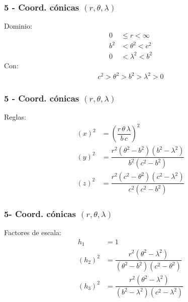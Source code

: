 \documentclass[12pt]{beamer}
\begin{document}
\begin{frame}
\frametitle{5 - Coord. cónicas $(r, \theta, \lambda)$}
\setlength{\abovedisplayskip}{-1pt}
\fontsize{12}{12}\selectfont
Dominio:
\begin{align*}
0 &\leq r < \infty \\
b^{2} &< \theta^{2} < c^{2} \\
0 &< \lambda^{2} < b^{2}
\end{align*}
Con:
\begin{align*}
c^{2} > \theta^{2} > b^{2} > \lambda^{2} > 0
\end{align*}
\end{frame}
\begin{frame}
\frametitle{5 - Coord. cónicas $(r, \theta, \lambda)$}
\setlength{\abovedisplayskip}{-1pt}
\fontsize{12}{12}\selectfont
Reglas:
\begin{align*}
(x)^{2} &= \left( \dfrac{r \, \theta \, \lambda}{b \, c} \right)^{2} \\[0.5em]
(y)^{2} &= \dfrac{r^{2} (\theta^{2} - b^{2})(b^{2} - \lambda^{2})}{b^{2}(c^{2} - b^{2})} \\[0.5em]
(z)^{2} &= \dfrac{r^{2} (c^{2} - \theta^{2})(c^{2} - \lambda^{2})}{c^{2} (c^{2} - b^{2})}
\end{align*}
\end{frame}
\begin{frame}
\frametitle{5- Coord. cónicas $(r, \theta, \lambda)$}
\setlength{\abovedisplayskip}{-1pt}
\fontsize{12}{12}\selectfont
Factores de escala:
\begin{align*}
h_{1} &= 1\\
(h_{2})^{2} &= \dfrac{r^{2} (\theta^{2} - \lambda^{2})}{(\theta^{2} - b^{2})(c^{2} - \theta^{2})} \\[0.5em]
(h_{3})^{2} &= \dfrac{r^{2} (\theta^{2} - \lambda^{2})}{(b^{2} - \lambda^{2})(c^{2} - \lambda^{2})}
\end{align*}
\end{frame}
\end{document}
